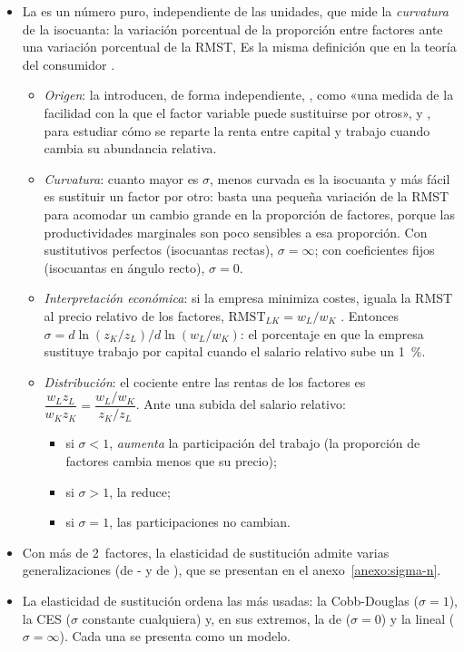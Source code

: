 \documentclass[11pt]{article}
\begin{document}
\begin{itemize}
\item La  es un número puro, independiente de las unidades, que mide la \emph{curvatura} de la isocuanta: la variación porcentual de la proporción entre factores ante una variación porcentual de la RMST,
  Es la misma definición que en la teoría del consumidor .
  \begin{itemize}
  \item \emph{Origen}: la introducen, de forma independiente, \textcite[p.~117]{Hicks1932Theory}, como «una medida de la facilidad con la que el factor variable puede sustituirse por otros», y \textcite{Robinson1933Economics}, para estudiar cómo se reparte la renta entre capital y trabajo cuando cambia su abundancia relativa\nocite{HET2026Elasticity}.
  \item \emph{Curvatura}: cuanto mayor es $\sigma$, menos curvada es la isocuanta y más fácil es sustituir un factor por otro: basta una pequeña variación de la RMST para acomodar un cambio grande en la proporción de factores, porque las productividades marginales son poco sensibles a esa proporción. Con sustitutivos perfectos (isocuantas rectas), $\sigma=\infty$; con coeficientes fijos (isocuantas en ángulo recto), $\sigma=0$.
  \item \emph{Interpretación económica}: si la empresa minimiza costes, iguala la RMST al precio relativo de los factores, $\mathrm{RMST}_{LK}=w_L/w_K$ . Entonces $\sigma=d\ln(z_K/z_L)/d\ln(w_L/w_K)$: el porcentaje en que la empresa sustituye trabajo por capital cuando el salario relativo sube un 1~\%.
  \item \emph{Distribución}: el cociente entre las rentas de los factores es $\dfrac{w_Lz_L}{w_Kz_K}=\dfrac{w_L/w_K}{z_K/z_L}$. Ante una subida del salario relativo\nocite{Hicks1932Theory}:
    \begin{itemize}
    \item si $\sigma<1$, \emph{aumenta} la participación del trabajo (la proporción de factores cambia menos que su precio);
    \item si $\sigma>1$, la reduce;
    \item si $\sigma=1$, las participaciones no cambian.
    \end{itemize}
  \end{itemize}
\item Con más de 2~factores, la elasticidad de sustitución admite varias generalizaciones (de - y de ), que se presentan en el anexo~\ref{anexo:sigma-n}.
\item La elasticidad de sustitución ordena las  más usadas: la Cobb-Douglas ($\sigma=1$), la CES ($\sigma$ constante cualquiera) y, en sus extremos, la de  ($\sigma=0$) y la lineal ($\sigma=\infty$). Cada una se presenta como un modelo.
\end{itemize}
\end{document}
